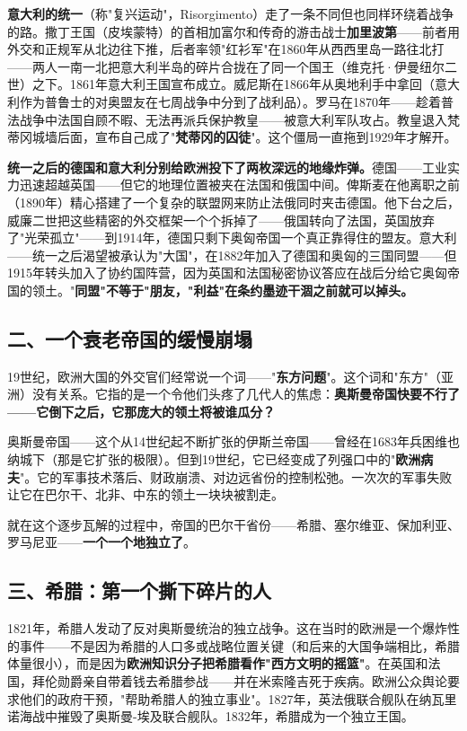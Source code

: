 \documentclass[a4paper,12pt]{ctexart}
\begin{document}
\textbf{意大利的统一}（称"复兴运动"，Risorgimento）走了一条不同但也同样环绕着战争的路。撒丁王国（皮埃蒙特）的首相加富尔和传奇的游击战士\textbf{加里波第}——前者用外交和正规军从北边往下推，后者率领"红衫军"在1860年从西西里岛一路往北打——两人一南一北把意大利半岛的碎片合拢在了同一个国王（维克托·伊曼纽尔二世）之下。1861年意大利王国宣布成立。威尼斯在1866年从奥地利手中拿回（意大利作为普鲁士的对奥盟友在七周战争中分到了战利品）。罗马在1870年——趁着普法战争中法国自顾不暇、无法再派兵保护教皇——被意大利军队攻占。教皇退入梵蒂冈城墙后面，宣布自己成了"\textbf{梵蒂冈的囚徒}"。这个僵局一直拖到1929年才解开。

\textbf{统一之后的德国和意大利分别给欧洲投下了两枚深远的地缘炸弹。}德国——工业实力迅速超越英国——但它的地理位置被夹在法国和俄国中间。俾斯麦在他离职之前（1890年）精心搭建了一个复杂的联盟网来防止法俄同时夹击德国。他下台之后，威廉二世把这些精密的外交框架一个个拆掉了——俄国转向了法国，英国放弃了"光荣孤立"——到1914年，德国只剩下奥匈帝国一个真正靠得住的盟友。意大利——统一之后渴望被承认为"大国"，在1882年加入了德国和奥匈的三国同盟——但1915年转头加入了协约国阵营，因为英国和法国秘密协议答应在战后分给它奥匈帝国的领土。"\textbf{同盟"不等于"朋友，"利益"在条约墨迹干涸之前就可以掉头。}

\subsection*{二、一个衰老帝国的缓慢崩塌}

19世纪，欧洲大国的外交官们经常说一个词——"\textbf{东方问题}"。这个词和"东方"（亚洲）没有关系。它指的是一个令他们头疼了几代人的焦虑：\textbf{奥斯曼帝国快要不行了——它倒下之后，它那庞大的领土将被谁瓜分？}

奥斯曼帝国——这个从14世纪起不断扩张的伊斯兰帝国——曾经在1683年兵困维也纳城下（那是它扩张的极限）。但到19世纪，它已经变成了列强口中的"\textbf{欧洲病夫}"。它的军事技术落后、财政崩溃、对边远省份的控制松弛。一次次的军事失败让它在巴尔干、北非、中东的领土一块块被割走。

就在这个逐步瓦解的过程中，帝国的巴尔干省份——希腊、塞尔维亚、保加利亚、罗马尼亚——\textbf{一个一个地独立了}。

\subsection*{三、希腊：第一个撕下碎片的人}

1821年，希腊人发动了反对奥斯曼统治的独立战争。这在当时的欧洲是一个爆炸性的事件——不是因为希腊的人口多或战略位置关键（和后来的大国争端相比，希腊体量很小），而是因为\textbf{欧洲知识分子把希腊看作"西方文明的摇篮"}。在英国和法国，拜伦勋爵亲自带着钱去希腊参战——并在米索隆吉死于疾病。欧洲公众舆论要求他们的政府干预，"帮助希腊人的独立事业"。1827年，英法俄联合舰队在纳瓦里诺海战中摧毁了奥斯曼-埃及联合舰队。1832年，希腊成为一个独立王国。
\end{document}
